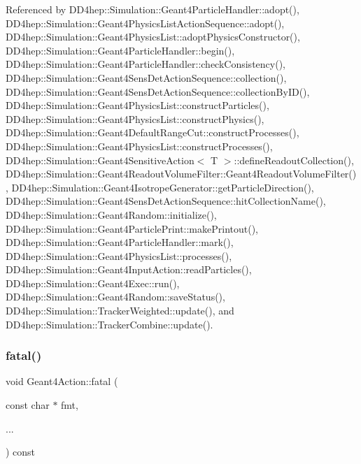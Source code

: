 Referenced by D\+D4hep\+::\+Simulation\+::\+Geant4\+Particle\+Handler\+::adopt(), D\+D4hep\+::\+Simulation\+::\+Geant4\+Physics\+List\+Action\+Sequence\+::adopt(), D\+D4hep\+::\+Simulation\+::\+Geant4\+Physics\+List\+::adopt\+Physics\+Constructor(), D\+D4hep\+::\+Simulation\+::\+Geant4\+Particle\+Handler\+::begin(), D\+D4hep\+::\+Simulation\+::\+Geant4\+Particle\+Handler\+::check\+Consistency(), D\+D4hep\+::\+Simulation\+::\+Geant4\+Sens\+Det\+Action\+Sequence\+::collection(), D\+D4hep\+::\+Simulation\+::\+Geant4\+Sens\+Det\+Action\+Sequence\+::collection\+By\+I\+D(), D\+D4hep\+::\+Simulation\+::\+Geant4\+Physics\+List\+::construct\+Particles(), D\+D4hep\+::\+Simulation\+::\+Geant4\+Physics\+List\+::construct\+Physics(), D\+D4hep\+::\+Simulation\+::\+Geant4\+Default\+Range\+Cut\+::construct\+Processes(), D\+D4hep\+::\+Simulation\+::\+Geant4\+Physics\+List\+::construct\+Processes(), D\+D4hep\+::\+Simulation\+::\+Geant4\+Sensitive\+Action$<$ T $>$\+::define\+Readout\+Collection(), D\+D4hep\+::\+Simulation\+::\+Geant4\+Readout\+Volume\+Filter\+::\+Geant4\+Readout\+Volume\+Filter(), D\+D4hep\+::\+Simulation\+::\+Geant4\+Isotrope\+Generator\+::get\+Particle\+Direction(), D\+D4hep\+::\+Simulation\+::\+Geant4\+Sens\+Det\+Action\+Sequence\+::hit\+Collection\+Name(), D\+D4hep\+::\+Simulation\+::\+Geant4\+Random\+::initialize(), D\+D4hep\+::\+Simulation\+::\+Geant4\+Particle\+Print\+::make\+Printout(), D\+D4hep\+::\+Simulation\+::\+Geant4\+Particle\+Handler\+::mark(), D\+D4hep\+::\+Simulation\+::\+Geant4\+Physics\+List\+::processes(), D\+D4hep\+::\+Simulation\+::\+Geant4\+Input\+Action\+::read\+Particles(), D\+D4hep\+::\+Simulation\+::\+Geant4\+Exec\+::run(), D\+D4hep\+::\+Simulation\+::\+Geant4\+Random\+::save\+Status(), D\+D4hep\+::\+Simulation\+::\+Tracker\+Weighted\+::update(), and D\+D4hep\+::\+Simulation\+::\+Tracker\+Combine\+::update().

\hypertarget{class_d_d4hep_1_1_simulation_1_1_geant4_action_ab7efc61d1f82a99fd8011ab2a24bbc07}{}\label{class_d_d4hep_1_1_simulation_1_1_geant4_action_ab7efc61d1f82a99fd8011ab2a24bbc07} 
\subsubsection{\texorpdfstring{fatal()}{fatal()}}
{\footnotesize\ttfamily void Geant4\+Action\+::fatal (\begin{DoxyParamCaption}\item[{const char $\ast$}]{fmt,  }\item[{}]{... }\end{DoxyParamCaption}) const}



